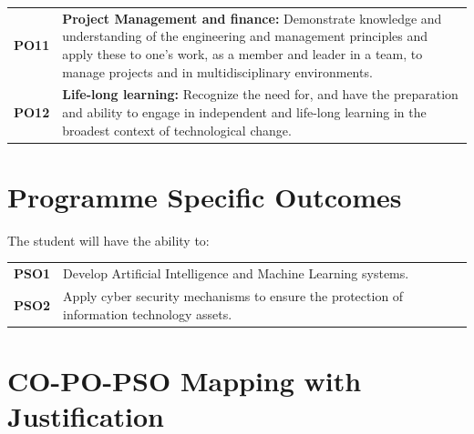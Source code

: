 \documentclass[12pt,a4paper]{article}
\begin{document}
\begin{tabular}{p{0.5cm} p{14cm}}
\textbf{PO11} & \textbf{Project Management and finance:} Demonstrate knowledge and understanding of the engineering and management principles and apply these to one's work, as a member and leader in a team, to manage projects and in multidisciplinary environments. \\
\textbf{PO12} & \textbf{Life-long learning:} Recognize the need for, and have the preparation and ability to engage in independent and life-long learning in the broadest context of technological change. \\
\end{tabular}

\newpage

\section*{Programme Specific Outcomes}
\vspace{0.5cm}

The student will have the ability to:

\medskip

\begin{tabular}{p{0.5cm} p{14cm}}
\textbf{PSO1} & Develop Artificial Intelligence and Machine Learning systems. \\
\textbf{PSO2} & Apply cyber security mechanisms to ensure the protection of information technology assets. \\
\end{tabular}

\newpage

\section*{CO-PO-PSO Mapping with Justification}
\vspace{0.5cm}
\end{document}
